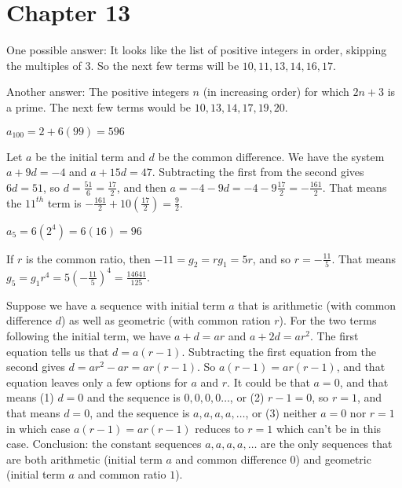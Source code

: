     \section*{Chapter 13}
\begin{Solution}{13.1}
One possible answer: It looks like the list of positive integers in order, skipping the multiples of $3$. So the next few terms will be $10, 11, 13, 14, 16, 17$.

Another answer: The positive integers $n$ (in increasing order) for which $2n+3$ is a prime. The next few terms
would be $10, 13, 14, 17, 19, 20$.
\end{Solution}

\begin{Solution}{13.2}
$a_{100}= 2+6(99) = 596$
\end{Solution}

\begin{Solution}{13.3}
Let $a$ be the initial term and $d$ be the common difference. We have the system $a + 9d = -4$ and $a+15d = 47$. Subtracting the first from the second gives $6d = 51$, so $d = \frac{51}{6} = \frac{17}{2}$, and then $a = 
-4 - 9d = -4 - 9\frac{17}{2} = -\frac{161}{2}$. That means the $11^{th}$ term is $-\frac{161}{2} + 10\left(\frac{17}{2}\right) = \frac{9}{2}$.
\end{Solution}

\begin{Solution}{13.4}
$a_5 = 6(2^4) = 6(16) = 96$
\end{Solution}

\begin{Solution}{13.5}
If $r$ is the common ratio, then $-11 = g_2 = rg_1 = 5r$, and so $r = -\frac{11}{5}$. That means
$g_5 = g_1 r^4 = 5\left (-\frac{11}{5}\right)^4 = \frac{14641}{125}$.
\end{Solution}

\begin{Solution}{13.6} Suppose we have a sequence with initial term $a$ that is arithmetic (with common difference $d$) as well as geometric (with common ration $r$). For the two terms following the initial term, we have $a+d = ar$ and $a+2d = ar^2$. The first equation tells us that $d = a(r-1)$. Subtracting the first equation from the second gives $d = ar^2-ar = ar(r-1)$. So $a(r-1) = ar(r-1)$, and that equation leaves only a few options
for $a$ and $r$. It could be that $a=0$, and that means (1)  $d=0$ and the sequence is $0,0,0,0\ldots$, or (2)  $r-1 = 0$, so $r=1$, and that means $d= 0$, and the sequence is $a,a,a,a,\ldots$, or (3) neither $a=0$ nor $r=1$
in which case $a(r-1) = ar(r-1)$ reduces to $r=1$ which can't be in this case.
Conclusion: the constant sequences $a,a,a,a,\ldots$  are the only sequences that are both arithmetic (initial term $a$ and common difference $0$) and geometric (initial term $a$ and common ratio $1$).
\end{Solution}

